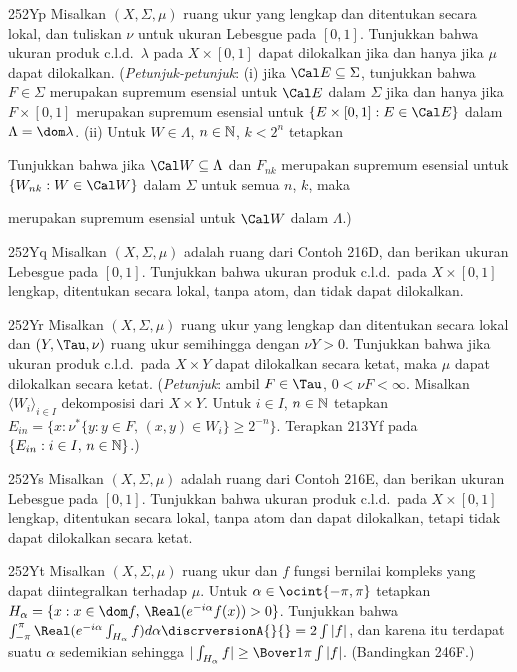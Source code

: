 {\spheader 252Yp Misalkan $(X,\Sigma,\mu)$ ruang ukur yang lengkap dan
ditentukan secara lokal, dan tuliskan $\nu$ untuk ukuran Lebesgue pada
$[0,1]$. Tunjukkan bahwa ukuran produk c.l.d.\ $\lambda$ pada
$X\times[0,1]$ dapat dilokalkan jika dan hanya jika $\mu$ dapat dilokalkan.
({\it Petunjuk-petunjuk\/}: (i) jika
$\Cal E\subseteq\Sigma$, tunjukkan bahwa $F\in\Sigma$ merupakan supremum
esensial untuk $\Cal E$ dalam $\Sigma$ jika dan hanya jika $F\times[0,1]$
merupakan supremum esensial untuk
$\{E\times[0,1]:E\in\Cal E\}$ dalam $\Lambda=\dom\lambda$. (ii) Untuk
$W\in\Lambda$, $n\in\Bbb N$, $k<2^n$ tetapkan


\noindent Tunjukkan bahwa jika $\Cal W\subseteq\Lambda$ dan $F_{nk}$ merupakan
supremum esensial untuk $\{W_{nk}:W\in\Cal W\}$ dalam $\Sigma$ untuk semua
$n$, $k$, maka


\noindent merupakan supremum esensial untuk $\Cal W$ dalam $\Lambda$.)

\spheader 252Yq Misalkan $(X,\Sigma,\mu)$ adalah ruang dari Contoh
216D, dan berikan ukuran Lebesgue pada $[0,1]$. Tunjukkan bahwa ukuran produk
c.l.d.\ pada $X\times [0,1]$ lengkap, ditentukan secara lokal,
tanpa atom, dan tidak dapat dilokalkan.

\spheader 252Yr Misalkan $(X,\Sigma,\mu)$ ruang ukur yang lengkap dan
ditentukan secara lokal dan $(Y,\Tau,\nu)$ ruang ukur semihingga dengan
$\nu Y>0$. Tunjukkan bahwa jika ukuran produk c.l.d.\ pada
$X\times Y$ dapat dilokalkan secara ketat, maka $\mu$ dapat dilokalkan secara
ketat. ({\it Petunjuk\/}: ambil $F\in\Tau$, $0<\nu F<\infty$. Misalkan
$\langle W_i\rangle_{i\in I}$ dekomposisi dari $X\times Y$. Untuk
$i\in I$, $n\in\Bbb N$
tetapkan $E_{in}=\{x:\nu^*\{y:y\in F,\,(x,y)\in W_i\}\ge 2^{-n}\}$. Terapkan
213Yf pada $\{E_{in}:i\in I,\,n\in\Bbb N\}$.)

\spheader 252Ys Misalkan $(X,\Sigma,\mu)$ adalah ruang dari Contoh
216E, dan berikan ukuran Lebesgue pada $[0,1]$. Tunjukkan bahwa ukuran produk
c.l.d.\ pada $X\times[0,1]$ lengkap, ditentukan secara lokal,
tanpa atom dan dapat dilokalkan, tetapi tidak dapat dilokalkan secara ketat.

\spheader 252Yt Misalkan $(X,\Sigma,\mu)$ ruang ukur dan $f$ fungsi bernilai
kompleks yang dapat diintegralkan terhadap $\mu$. Untuk
$\alpha\in\ocint{-\pi,\pi}$
tetapkan $H_{\alpha}=\{x:x\in\dom f,\,\Real(e^{-i\alpha}f(x))>0\}$. Tunjukkan
bahwa $\int_{-\pi}^{\pi}\Real(e^{-i\alpha}\int_{H_{\alpha}}f)d\alpha
\discrversionA{\break}{}=2\int|f|$, dan karena itu terdapat suatu
$\alpha$ sedemikian sehingga
$|\int_{H_{\alpha}}f|\ge\Bover1{\pi}\int|f|$. (Bandingkan 246F.)

}
